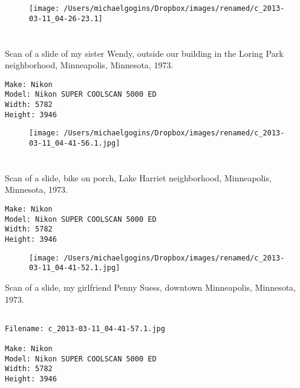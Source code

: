 \documentclass[11pt,letter,DIV=14,paper=landscape]{scrbook}
\begin{document}
\begin{figure}
\texttt{[image: /Users/michaelgogins/Dropbox/images/renamed/c\_2013-03-11\_04-26-23.1]}
\end{figure}

\clearpage
\section{\protect{}}
\noindent Scan of a slide of my sister Wendy, outside our building in the Loring Park neighborhood, Minneapolis, Minnesota, 1973.
\noindent
\begin{lstlisting}
Make: Nikon
Model: Nikon SUPER COOLSCAN 5000 ED
Width: 5782
Height: 3946
\end{lstlisting}
\clearpage

\begin{figure}
\texttt{[image: /Users/michaelgogins/Dropbox/images/renamed/c\_2013-03-11\_04-41-56.1.jpg]}
\end{figure}
\clearpage
\section{\protect{}}
\noindent Scan of a slide, bike on porch, Lake Harriet neighborhood, Minneapolis, Minnesota, 1973.
\noindent
\begin{lstlisting}
Make: Nikon
Model: Nikon SUPER COOLSCAN 5000 ED
Width: 5782
Height: 3946
\end{lstlisting}
\clearpage

\begin{figure}
\texttt{[image: /Users/michaelgogins/Dropbox/images/renamed/c\_2013-03-11\_04-41-52.1.jpg]}
\end{figure}
\iffalse    
\clearpage
\noindent Scan of a slide, my girlfriend Penny Suess, downtown Minneapolis, Minnesota, 1973.
\noindent
\begin{lstlisting}

Filename: c_2013-03-11_04-41-57.1.jpg

Make: Nikon
Model: Nikon SUPER COOLSCAN 5000 ED
Width: 5782
Height: 3946
\end{lstlisting}
\clearpage
\end{document}
